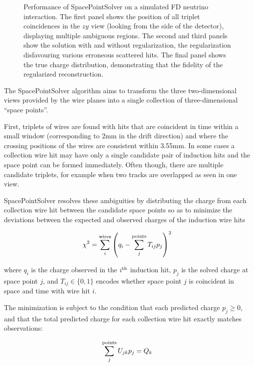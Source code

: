 \begin{figure}
\caption[Event displays of SpacePointSolver performance]{Performance of SpacePointSolver on a simulated FD neutrino interaction. The first panel shows the position of all triplet coincidences in the $zy$ view (looking from the side of the detector), displaying multiple ambiguous regions. The second and third panels show the solution with and without regularization, the regularization disfavouring various erroneous scattered hits. The final panel shows the true charge distribution, demonstrating that the fidelity of the regularized reconstruction.}

\label{fig:spacepoint}
\end{figure}

The SpacePointSolver algorithm aims to transform the three two-dimensional views provided by the wire planes into a single collection of three-dimensional ``space points''.

First, triplets of wires are found with hits that are coincident in time within a small window (corresponding to 2mm in the drift direction) and where the crossing positions of the wires are consistent within 3.55mm. In some cases a collection wire hit may have only a single candidate pair of induction hits and the space point can be formed immediately. Often though, there are multiple candidate triplets, for example when two tracks are overlapped as seen in one view.

SpacePointSolver resolves these ambiguities by distributing the charge from each collection wire hit between the candidate space points so as to minimize the deviations between the expected and observed charges of the induction wire hits

\begin{equation}
\chi^2 = \sum_i^{\rm wires} \left(q_i - \sum_j^{\rm points}T_{ij}p_j\right)^2
\end{equation}

where $q_i$ is the charge observed in the $i^{\rm th}$ induction hit, $p_j$ is the solved charge at space point $j$, and $T_{ij}\in\{0,1\}$ encodes whether space point $j$ is coincident in space and time with wire hit $i$.

The minimization is subject to the condition that each predicted charge $p_j\ge0$, and that the total predicted charge for each collection wire hit exactly matches observations:

\begin{equation}
\sum_j^{\rm points}U_{jk}p_j=Q_k
\end{equation}

